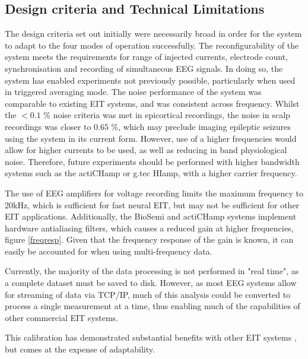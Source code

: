 \subsection{Design criteria and Technical Limitations}
The design criteria set out initially were necessarily broad in order for the system to adapt to the four modes of operation successfully. The reconfigurability of the system meets the requirements for range of injected currents, electrode count, synchronisation and recording of simultaneous EEG signals. In doing so, the system has enabled experiments not previously possible, particularly when used in triggered averaging mode. The noise performance of the system was comparable to existing EIT systems, and was consistent across frequency. Whilst the  $<0.1$ \% noise criteria was met in epicortical recordings, the noise in scalp recordings was closer to $0.65$ \%, which may preclude imaging epileptic seizures using the system in its current form. However, use of a higher frequencies would allow for higher currents to be used, as well as reducing in band physiological noise. Therefore, future experiments should be performed with higher bandwidth systems such as the actiCHamp or g.tec HIamp, with a higher carrier frequency. 


The use of EEG amplifiers for voltage recording limits the maximum frequency to 20kHz, which is sufficient for fast neural EIT, but may not be sufficient for other EIT applications. Additionally, the BioSemi and actiCHamp systems implement hardware antialiasing filters, which causes a reduced gain at higher frequencies, figure \ref{freqresp}. Given that the frequency response of the gain is known, it can easily be accounted for when using multi-frequency data. 

Currently, the majority of the data processing is not performed in "real time", as a complete dataset must be saved to disk. However, as most EEG systems allow for streaming of data via TCP/IP, much of this analysis could be converted to process a single measurement at a time, thus enabling much of the capabilities of other commercial EIT systems.

This calibration has demonstrated substantial benefits with other EIT systems \cite{Hun_Wi_2014} \cite{khan}, but comes at the expense of adaptability.